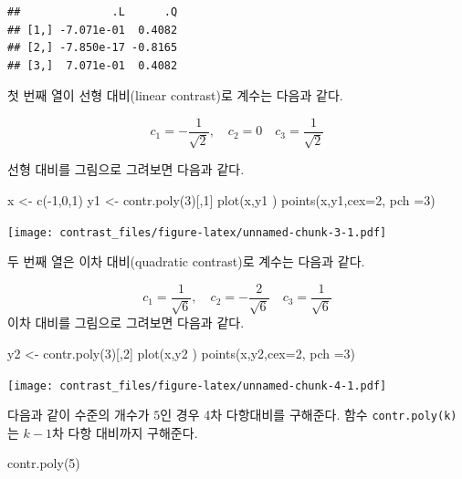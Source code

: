 \documentclass[
]{book}
\newenvironment{Shaded}{\begin{snugshade}}{\end{snugshade}}
\newcommand{\AttributeTok}[1]{\textcolor[rgb]{0.77,0.63,0.00}{#1}}
\newcommand{\DecValTok}[1]{\textcolor[rgb]{0.00,0.00,0.81}{#1}}
\newcommand{\FunctionTok}[1]{\textcolor[rgb]{0.00,0.00,0.00}{#1}}
\newcommand{\NormalTok}[1]{#1}
\newcommand{\OtherTok}[1]{\textcolor[rgb]{0.56,0.35,0.01}{#1}}
\newcommand{\SpecialCharTok}[1]{\textcolor[rgb]{0.00,0.00,0.00}{#1}}
\begin{document}
\begin{verbatim}
##              .L      .Q
## [1,] -7.071e-01  0.4082
## [2,] -7.850e-17 -0.8165
## [3,]  7.071e-01  0.4082
\end{verbatim}

첫 번째 열이 선형 대비(linear contrast)로 계수는 다음과 같다.

\[ c_1= - \frac{1}{\sqrt{2}}, \quad c_2 =0 \quad c_3= \frac{1}{\sqrt{2}} \]

선형 대비를 그림으로 그려보면 다음과 같다.

\begin{Shaded}
\begin{Highlighting}[]
\NormalTok{x }\OtherTok{\textless{}{-}} \FunctionTok{c}\NormalTok{(}\SpecialCharTok{{-}}\DecValTok{1}\NormalTok{,}\DecValTok{0}\NormalTok{,}\DecValTok{1}\NormalTok{)}
\NormalTok{y1 }\OtherTok{\textless{}{-}} \FunctionTok{contr.poly}\NormalTok{(}\DecValTok{3}\NormalTok{)[,}\DecValTok{1}\NormalTok{]}
\FunctionTok{plot}\NormalTok{(x,y1 )}
\FunctionTok{points}\NormalTok{(x,y1,}\AttributeTok{cex=}\DecValTok{2}\NormalTok{, }\AttributeTok{pch =}\DecValTok{3}\NormalTok{)}
\end{Highlighting}
\end{Shaded}

\texttt{[image: contrast\_files/figure-latex/unnamed-chunk-3-1.pdf]}

두 번째 열은 이차 대비(quadratic contrast)로 계수는 다음과 같다.

\[ c_1=  \frac{1}{\sqrt{6}}, \quad c_2 = - \frac{2}{\sqrt{6}} \quad c_3=  \frac{1}{\sqrt{6}} \]
이차 대비를 그림으로 그려보면 다음과 같다.

\begin{Shaded}
\begin{Highlighting}[]
\NormalTok{y2 }\OtherTok{\textless{}{-}} \FunctionTok{contr.poly}\NormalTok{(}\DecValTok{3}\NormalTok{)[,}\DecValTok{2}\NormalTok{]}
\FunctionTok{plot}\NormalTok{(x,y2 )}
\FunctionTok{points}\NormalTok{(x,y2,}\AttributeTok{cex=}\DecValTok{2}\NormalTok{, }\AttributeTok{pch =}\DecValTok{3}\NormalTok{)}
\end{Highlighting}
\end{Shaded}

\texttt{[image: contrast\_files/figure-latex/unnamed-chunk-4-1.pdf]}

다음과 같이 수준의 개수가 \(5\)인 경우 4차 다항대비를 구해준다. 함수 \texttt{contr.poly(k)}는 \(k-1\)차 다항 대비까지 구해준다.

\begin{Shaded}
\begin{Highlighting}[]
\FunctionTok{contr.poly}\NormalTok{(}\DecValTok{5}\NormalTok{)}
\end{Highlighting}
\end{Shaded}
\end{document}
